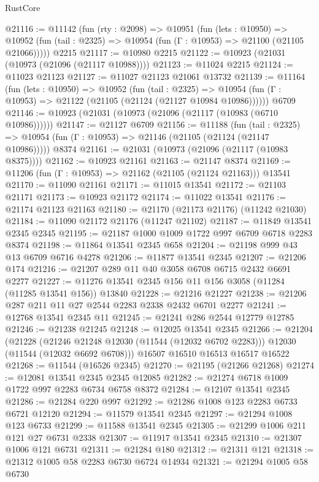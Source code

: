 \begin{lexlean}{RustCore}
\begin{coremodule}
@21116 := @11142
    (fun (rty : @2098) =>
    @10951
      (fun (lets : @10950) =>
      @10952 (fun (tail : @2325) => @10954 (fun (Γ : @10953) => @21100 (@21105 @21066)))))
    @2215
@21117 := @10980 @2215
@21122 := @10923 (@21031 (@10973 (@21096 (@21117 @10988))))
@21123 := @11024 @2215
@21124 := @11023 @21123
@21127 := @11027 @21123 @21061 @13732
@21139 := @11164
    (fun (lets : @10950) =>
    @10952
      (fun (tail : @2325) =>
      @10954 (fun (Γ : @10953) => @21122 (@21105 (@21124 (@21127 @10984 @10986))))))
    @6709
@21146 := @10923 (@21031 (@10973 (@21096 (@21117 (@10983 (@6710 @10986))))))
@21147 := @21127 @6709
@21156 := @11188
    (fun (tail : @2325) => @10954 (fun (Γ : @10953) => @21146 (@21105 (@21124 (@21147 @10986)))))
    @8374
@21161 := @21031 (@10973 (@21096 (@21117 (@10983 @8375))))
@21162 := @10923 @21161
@21163 := @21147 @8374
@21169 := @11206 (fun (Γ : @10953) => @21162 (@21105 (@21124 @21163))) @13541
@21170 := @11090 @21161
@21171 := @11015 @13541
@21172 := @21103 @21171
@21173 := @10923 @21172
@21174 := @11022 @13541
@21176 := @21174 @21123 @21163
@21180 := @21170 (@21173 @21176) (@11242 @21030)
@21184 := @11090 @21172 @21176 (@11247 @21102)
@21187 := @11849 @13541 @2345 @2345
@21195 := @21187 @1000 @1009 @1722 @997 @6709 @6718 @2283 @8374
@21198 := @11864 @13541 @2345 @658
@21204 := @21198 @999 @43 @13 @6709 @6716 @4278
@21206 := @11877 @13541 @2345
@21207 := @21206 @174
@21216 := @21207 @289 @11 @40 @3058 @6708 @6715 @2432 @6691 @2277
@21227 := @11276 @13541 @2345 @156 @11 @156 @3058 (@11284 (@11285 @13541 @156)) @13840
@21228 := @21216 @21227
@21238 := @21206 @287 @211 @11 @27 @2544 @2283 @2338 @2432 @6701 @2277
@21241 := @12768 @13541 @2345 @11
@21245 := @21241 @286 @2544 @12779 @12785
@21246 := @21238 @21245
@21248 := @12025 @13541 @2345
@21266 := @21204
    (@21228
      (@21246 @21248 @12030 (@11544 (@12032 @6702 @2283)))
      @12030
      (@11544 (@12032 @6692 @6708)))
    @16507
    @16510
    @16513
    @16517
    @16522
@21268 := @11544 (@16526 @2345)
@21270 := @21195 (@21266 @21268)
@21274 := @12081 @13541 @2345 @2345 @12085
@21282 := @21274 @6718 @1009 @1722 @997 @2283 @6734 @6758 @8372
@21284 := @12107 @13541 @2345
@21286 := @21284 @220 @997
@21292 := @21286 @1008 @123 @2283 @6733 @6721 @12120
@21294 := @11579 @13541 @2345
@21297 := @21294 @1008 @123 @6733
@21299 := @11588 @13541 @2345
@21305 := @21299 @1006 @211 @121 @27 @6731 @2338
@21307 := @11917 @13541 @2345
@21310 := @21307 @1006 @121 @6731
@21311 := @21284 @180
@21312 := @21311 @121
@21318 := @21312 @1005 @58 @2283 @6730 @6724 @14934
@21321 := @21294 @1005 @58 @6730

\end{coremodule}
\end{lexlean}
